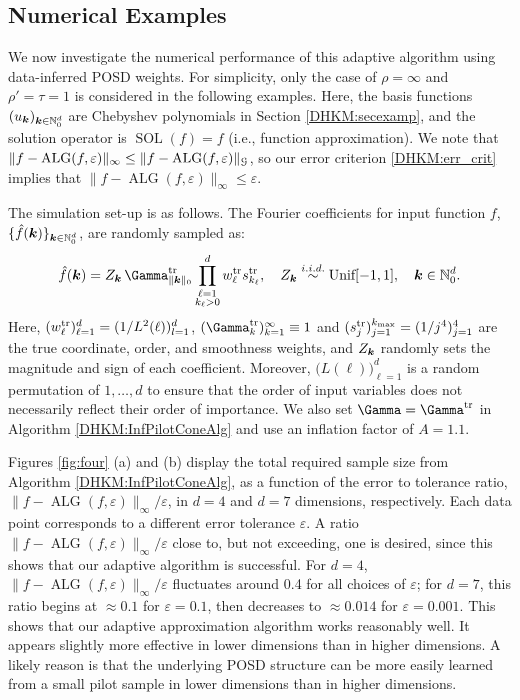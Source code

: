 \documentclass[USenglish]{article}
\theoremstyle{dgthm}
\theoremstyle{dgthm}
\theoremstyle{dgthm}
\theoremstyle{dgthm}
\theoremstyle{dgdef}
\theoremstyle{definition}
\DeclareMathOperator{\SOL}{SOL}
\DeclareMathOperator{\ALG}{ALG}
\begin{document}
\subsection{Numerical Examples} \label{DHKM:numexamp_sec}

We now investigate the numerical performance of this adaptive algorithm using data-inferred POSD weights. For simplicity, only the case of $\rho = \infty$ and $\rho' = \tau = 1$ is considered in the following examples. Here, the basis functions $(u_{\boldsymbol{k}})_{{\boldsymbol{k}} \in \mathbb{N}_0^d}$ are Chebyshev polynomials in Section \ref{DHKM:secexamp}, and the solution operator is $\SOL (f) = f$ (i.e., function approximation). We note that $\|f - \ALG(f,\varepsilon)\|_\infty \le \|f - \ALG(f,\varepsilon)\|_\calG$, so our error criterion \eqref{DHKM:err_crit} implies that $\|f - \ALG(f,\varepsilon)\|_\infty \le \varepsilon$.

The simulation set-up is as follows. The Fourier coefficients for input function $f$, $\{\hat{f}({\boldsymbol{k}})\}_{{\boldsymbol{k}} \in \mathbb{N}_0^d}$, are randomly sampled as:
\begin{equation*}
\hat{f}(\bsk) = Z_{\bsk} \,  {\Gamma}_{\|\bsk\|_0}^{\rm tr} \prod_{\substack{\ell=1\\ k_\ell>0}}^d {w_\ell^{\rm tr}} {s}_{k_\ell}^{\rm tr}, \quad Z_{\bsk} \overset{i.i.d.}{\sim} \text{Unif}[-1, 1], \quad \bsk \in \mathbb{N}_0^d.
\end{equation*}
Here, $(w_\ell^{\rm tr})_{\ell=1}^d = (1/L^2(\ell))_{l=1}^d$, $({\Gamma_k^{\rm tr}})_{k=1}^\infty \equiv 1$ and $(s_j^{\rm tr})_{j=1}^{k_{\rm max}} = (1/j^4)_{j=1}^4$ are the true coordinate, order, and smoothness weights, and $Z_{{\boldsymbol{k}}}$ randomly sets the magnitude and sign of each coefficient. Moreover, $\bigl(L(\ell)\bigr)_{\ell=1}^d$ is a random permutation of $1, \ldots, d$ to ensure that the order of input variables does not necessarily reflect their order of importance. We also set $\boldsymbol{\Gamma} = \boldsymbol{\Gamma}^{\rm tr}$ in Algorithm \ref{DHKM:InfPilotConeAlg} and use an inflation factor of $A = 1.1$.

Figures \ref{fig:four} (a) and (b) display the total required sample size from Algorithm \ref{DHKM:InfPilotConeAlg}, as a function of the error to tolerance ratio, $\|f - \ALG(f,\varepsilon)\|_\infty/\varepsilon$, in $d=4$ and $d=7$ dimensions, respectively. Each data point corresponds to a different error tolerance $\varepsilon$. A ratio $\|f - \ALG(f,\varepsilon)\|_\infty/\varepsilon$ close to, but not exceeding, one is desired, since this shows that our adaptive algorithm is successful. For $d=4$, $\|f - \ALG(f,\varepsilon)\|_\infty/\varepsilon$ fluctuates around 0.4 for all choices of $\varepsilon$; for $d=7$, this ratio begins at $\approx 0.1$ for $\varepsilon = 0.1$, then decreases to $\approx 0.014$ for $\varepsilon = 0.001$. This shows that our adaptive approximation algorithm works reasonably well.  It appears slightly more effective in lower dimensions  than in higher dimensions. A likely reason is that the underlying POSD structure can be more easily learned from a small pilot sample in lower dimensions than in higher dimensions.
\end{document}
